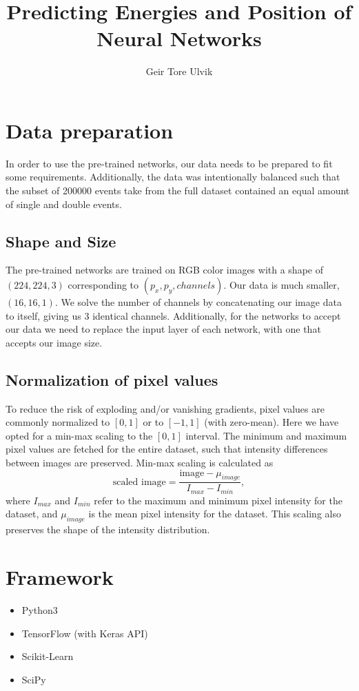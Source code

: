 \documentclass[12pt, notitlepage]{article}
\newcommand{\f}[2]{\frac{#1}{#2}}
\begin{document}
\title{Predicting Energies and Position of  Neural Networks}
\author{Geir Tore Ulvik}
\maketitle


\section{Data preparation}
In order to use the pre-trained networks, our data needs to be prepared to fit some requirements.
Additionally, the data was intentionally balanced such that the subset of 200000 events take from
the full dataset contained an equal amount of single and double events.
\subsection{Shape and Size}
The pre-trained networks are trained on RGB color images with a shape of $(224, 224, 3)$
corresponding to $(p_x, p_y, channels)$. Our data is much smaller, $(16, 16, 1)$. 
We solve the number of channels by concatenating our image data to itself, giving us 3 identical channels. 
Additionally, for the networks to accept our data we need to replace the input layer of each network,
with one that accepts our image size.
\subsection{Normalization of pixel values}
To reduce the risk of exploding and/or vanishing gradients, pixel values are commonly
normalized to $[0, 1]$ or to $[-1, 1]$ (with zero-mean). Here we have opted for a min-max scaling to the $[0, 1]$ interval.
The minimum and maximum pixel values are fetched for the entire dataset, such that intensity differences
between images are preserved. Min-max scaling is calculated as
\begin{equation}
    \text{scaled image} = \f{\text{image} - \mu_{image}}{I_{max} - I_{min}},
\end{equation}
where $I_{max}$ and $I_{min}$ refer to the maximum and minimum pixel intensity for the dataset,
and $\mu_{image}$ is the mean pixel intensity for the dataset. This scaling also preserves the
shape of the intensity distribution.

\section{Framework}
\begin{itemize}
    \item Python3
    \item TensorFlow (with Keras API)
    \item Scikit-Learn
    \item SciPy
\end{itemize}
\end{document}
